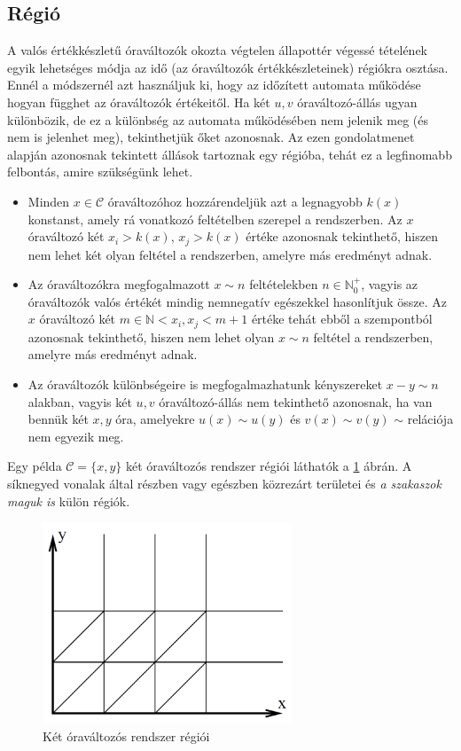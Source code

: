 \subsection{Régió}
A valós értékkészletű óraváltozók okozta végtelen állapottér végessé tételének egyik lehetséges módja az idő (az óraváltozók értékkészleteinek) régiókra osztása. Ennél a módszernél azt használjuk ki, hogy az időzített automata működése hogyan függhet az óraváltozók értékeitől. Ha két $u, v$ óraváltozó-állás ugyan különbözik, de ez a különbség az automata működésében nem jelenik meg (és nem is jelenhet meg), tekinthetjük őket azonosnak. Az ezen gondolatmenet alapján azonosnak tekintett állások tartoznak egy régióba, tehát ez a legfinomabb felbontás, amire szükségünk lehet.
\begin{itemize}
    \item Minden $x \in \mathcal{C}$ óraváltozóhoz hozzárendeljük azt a legnagyobb $k(x)$ konstanst, amely rá vonatkozó feltételben szerepel a rendszerben. Az $x$ óraváltozó két $x_i > k(x)$, $x_j > k(x)$ értéke azonosnak tekinthető, hiszen nem lehet két olyan feltétel a rendszerben, amelyre más eredményt adnak.
    
    \item Az óraváltozókra megfogalmazott $x \sim n$ feltételekben $n \in \mathbb{N}_0^+$, vagyis az óraváltozók valós értékét mindig nemnegatív egészekkel hasonlítjuk össze. Az $x$ óraváltozó két $m \in \mathbb{N} < x_i, x_j < m + 1$ értéke tehát ebből a szempontból azonosnak tekinthető, hiszen nem lehet olyan $x \sim n$ feltétel a rendszerben, amelyre más eredményt adnak.
    
    \item Az óraváltozók különbségeire is megfogalmazhatunk kényszereket $x - y \sim n$ alakban, vagyis két $u, v$ óraváltozó-állás nem tekinthető azonosnak, ha van bennük két $x, y$ óra, amelyekre $u(x) \sim u(y)$ és $v(x) \sim v(y)$ $\sim$ relációja nem egyezik meg.
\end{itemize}

Egy példa $\mathcal{C} = \{x, y\}$ két óraváltozós rendszer régiói láthatók a \ref{fig:regiok-pelda} ábrán. A síknegyed vonalak által részben vagy egészben közrezárt területei és \emph{a szakaszok maguk is} külön régiók.

\begin{figure}
    \centering
    \includegraphics[height=60mm, keepaspectratio]{figures/regiok-pelda.png}
    \caption{Két óraváltozós rendszer régiói \cite{TimedAutomata}}
    \label{fig:regiok-pelda}
\end{figure}

